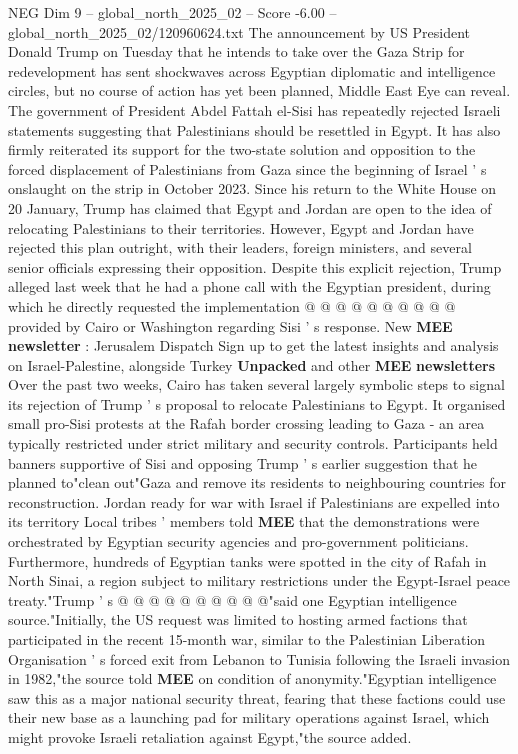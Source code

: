 \begin{textsample}{NEG Dim 9 – global\_north\_2025\_02 – Score -6.00 – global\_north\_2025\_02/120960624.txt}  \label{ex:f9_neg_015}
The announcement by US President Donald Trump on Tuesday that he intends to take over the Gaza Strip for redevelopment has sent shockwaves across Egyptian diplomatic and intelligence circles, but no course of action has yet been planned, Middle East Eye can reveal.
The government of President Abdel Fattah el-Sisi has repeatedly rejected Israeli statements suggesting that Palestinians should be resettled in Egypt.
It has also firmly reiterated its support for the two-state solution and opposition to the forced displacement of Palestinians from Gaza since the beginning of Israel ' s onslaught on the strip in October 2023.
Since his return to the White House on 20 January, Trump has claimed that Egypt and Jordan are open to the idea of relocating Palestinians to their territories.
However, Egypt and Jordan have rejected this plan outright, with their leaders, foreign ministers, and several senior officials expressing their opposition.
Despite this explicit rejection, Trump alleged last week that he had a phone call with the Egyptian president, during which he directly requested the implementation @ @ @ @ @ @ @ @ @ @ provided by Cairo or Washington regarding Sisi ' s response.
New \textbf{MEE} \textbf{newsletter} : Jerusalem Dispatch Sign up to get the latest insights and analysis on Israel-Palestine, alongside Turkey \textbf{Unpacked} and other \textbf{MEE} \textbf{newsletters} Over the past two weeks, Cairo has taken several largely symbolic steps to signal its rejection of Trump ' s proposal to relocate Palestinians to Egypt.
It organised small pro-Sisi protests at the Rafah border crossing leading to Gaza - an area typically restricted under strict military and security controls.
Participants held banners supportive of Sisi and opposing Trump ' s earlier suggestion that he planned to"clean out"Gaza and remove its residents to neighbouring countries for reconstruction.
Jordan ready for war with Israel if Palestinians are expelled into its territory Local tribes ' members told \textbf{MEE} that the demonstrations were orchestrated by Egyptian security agencies and pro-government politicians.
Furthermore, hundreds of Egyptian tanks were spotted in the city of Rafah in North Sinai, a region subject to military restrictions under the Egypt-Israel peace treaty."Trump ' s @ @ @ @ @ @ @ @ @ @"said one Egyptian intelligence source."Initially, the US request was limited to hosting armed factions that participated in the recent 15-month war, similar to the Palestinian Liberation Organisation ' s forced exit from Lebanon to Tunisia following the Israeli invasion in 1982,"the source told \textbf{MEE} on condition of anonymity."Egyptian intelligence saw this as a major national security threat, fearing that these factions could use their new base as a launching pad for military operations against Israel, which might provoke Israeli retaliation against Egypt,"the source added.

\end{textsample}

